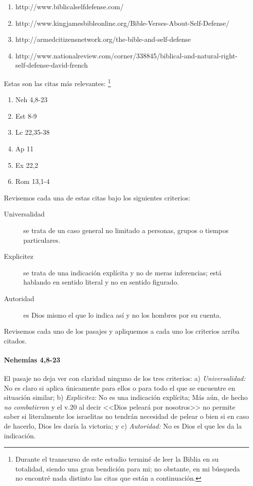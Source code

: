 \documentclass{article}
\begin{document}
\begin{enumerate}
\item http://www.biblicalselfdefense.com/
\item http://www.kingjamesbibleonline.org/Bible-Verses-About-Self-Defense/
\item http://armedcitizensnetwork.org/the-bible-and-self-defense
\item http://www.nationalreview.com/corner/338845/biblical-and-natural-right-self-defense-david-french
\end{enumerate}

\noindent
Estas son las citas m\'as relevantes:%
    \footnote{Durante el transcurso de este estudio terminé de leer la Biblia en su totalidad, siendo una gran bendición para mi; no obstante, en mi búsqueda no encontré nada distinto las citas que están a continuación.}

\begin{enumerate}
\item Neh 4,8-23
\item Est 8-9
\item Lc 22,35-38
\item Ap 11
\item Ex 22,2
\item Rom 13,1-4
\end{enumerate}

\noindent
Revisemos cada una de estas citas bajo los siguientes criterios:

\begin{description}
\item[Universalidad] se trata de un caso general no limitado a personas, grupos o tiempos particulares.
\item[Explicitez] se trata de una indicaci\'{o}n expl\'{i}cita y no de meras inferencias; est\'a hablando en sentido literal y no en sentido figurado.
\item[Autoridad] es Dios mismo el que lo indica as\'{i} y no los hombres por su cuenta.
\end{description}

\noindent
Revisemos cada uno de los pasajes y apliquemos a cada uno los criterios arriba citados.

\paragraph{Nehem\'{i}as 4,8-23}

El pasaje no deja ver con claridad ninguno de los tres criterios: a) \emph{Universalidad:} No es claro si aplica \'unicamente para ellos o para todo el que se encuentre en situaci\'on similar; b) \emph{Explicitez:} No es una indicaci\'on expl\'{i}cita; M\'as a\'un, de hecho \emph{no combatieron} y el v.20 al decir <<Dios pelear\'a por nosotros>> no permite saber si literalmente los israelitas no tendr\'an necesidad de pelear o bien si en caso de hacerlo, Dios les dar\'{i}a la victoria; y c) \emph{Autoridad:} No es Dios el que les da la indicaci\'on.
\end{document}
